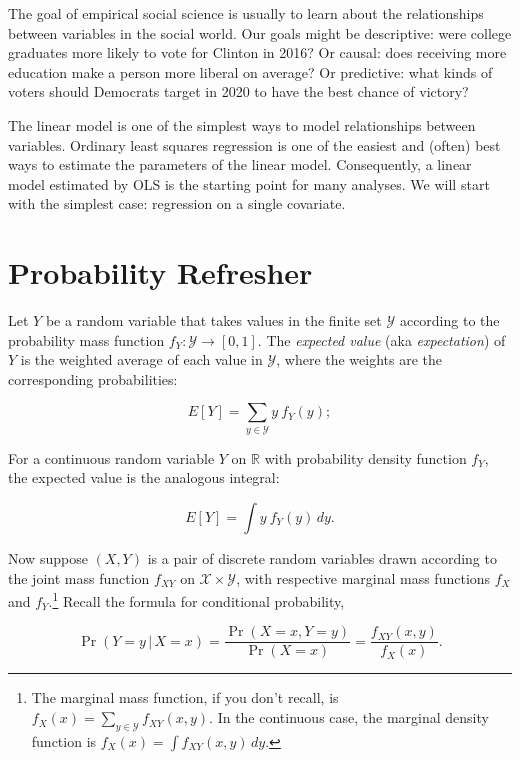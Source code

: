 \documentclass[12pt,oneside,openany]{book}
\let\rmarkdownfootnote\footnote%
\def\footnote{\protect\rmarkdownfootnote}
\begin{document}
The goal of empirical social science is usually to learn about the
relationships between variables in the social world. Our goals might be
descriptive: were college graduates more likely to vote for Clinton in
2016? Or causal: does receiving more education make a person more
liberal on average? Or predictive: what kinds of voters should Democrats
target in 2020 to have the best chance of victory?

The linear model is one of the simplest ways to model relationships
between variables. Ordinary least squares regression is one of the
easiest and (often) best ways to estimate the parameters of the linear
model. Consequently, a linear model estimated by OLS is the starting
point for many analyses. We will start with the simplest case:
regression on a single covariate.

\section{Probability Refresher}\label{probability-refresher}

Let \(Y\) be a random variable that takes values in the finite set
\(\mathcal{Y}\) according to the probability mass function
\(f_Y : \mathcal{Y} \to [0, 1]\). The \emph{expected value} (aka
\emph{expectation}) of \(Y\) is the weighted average of each value in
\(\mathcal{Y}\), where the weights are the corresponding probabilities:

\begin{equation}
E[Y] = \sum_{y \in \mathcal{Y}} y \: f_Y(y);
\end{equation}

For a continuous random variable \(Y\) on \(\mathbb{R}\) with
probability density function \(f_Y\), the expected value is the
analogous integral:

\begin{equation}
E[Y] = \int y \: f_Y(y) \, dy.
\end{equation}

Now suppose \((X, Y)\) is a pair of discrete random variables drawn
according to the joint mass function \(f_{XY}\) on
\(\mathcal{X} \times \mathcal{Y}\), with respective marginal mass
functions \(f_X\) and \(f_Y\).\footnote{The marginal mass function, if
  you don't recall, is
  \(f_X(x) = \sum_{y \in \mathcal{Y}} f_{XY} (x, y)\). In the continuous
  case, the marginal density function is
  \(f_X(x) = \int f_{XY} (x, y) \, dy\).} Recall the formula for
conditional probability,

\begin{equation}
\Pr(Y = y \,|\, X = x)
= \frac{\Pr(X = x, Y = y)}{\Pr(X = x)}
= \frac{f_{XY}(x, y)}{f_X(x)}.
\end{equation}
\end{document}
